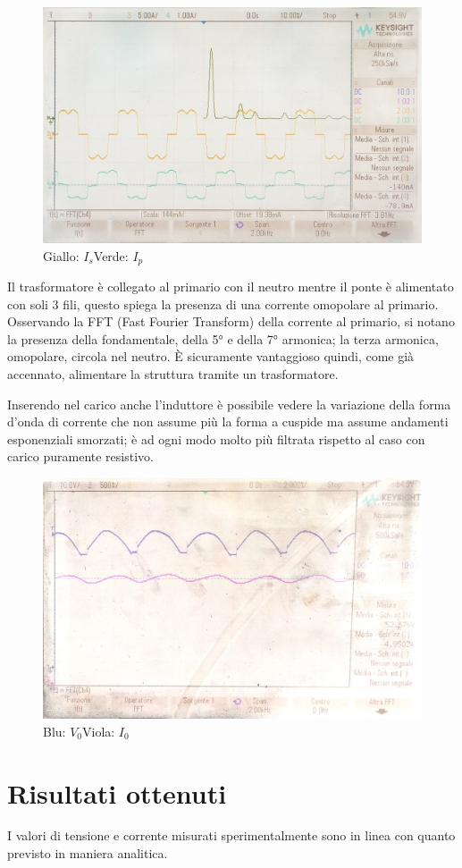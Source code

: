 \documentclass[a4paper,11pt]{article}
\begin{document}
\begin{figure}[H]
 \centering
 \includegraphics[keepaspectratio=true,width=0.9\linewidth]
 {correnti_FFT_2_neg.jpg}
 \caption{Giallo: \(I_s\)\quad Verde: \(I_p\)}
 \label{fig:correnti_fase_carico_R}
 \end{figure}
Il trasformatore è collegato al primario con il neutro mentre il ponte è 
alimentato con soli 3 fili, questo spiega la presenza di una corrente
omopolare al primario. Osservando la FFT (Fast Fourier Transform) della corrente al 
primario, si notano la 
presenza della fondamentale, della \ang{5} e della \ang{7} armonica; la terza 
armonica, omopolare, circola nel neutro. È sicuramente vantaggioso quindi, come già
accennato, alimentare la struttura tramite un trasformatore.

Inserendo nel carico anche l'induttore è possibile vedere la variazione della forma
d'onda di corrente che non assume più la forma a cuspide ma assume andamenti 
esponenziali smorzati; è ad ogni modo molto più filtrata rispetto al caso con carico
puramente resistivo.
\begin{figure}[H]
 \centering
 \includegraphics[keepaspectratio=true,width=0.9\linewidth]
 {tensione_e_corrente_3_neg.JPG}
 \caption{Blu: \(V_0\)\quad Viola: \(I_0\)}
 \label{fig:tensioni_carico_RL}
 \end{figure}

\section{Risultati ottenuti}
I valori di tensione e corrente misurati sperimentalmente sono in linea con quanto 
previsto in maniera analitica.
\end{document}
